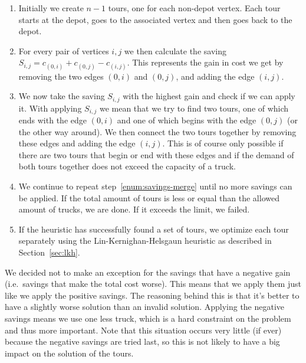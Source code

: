 \documentclass[12pt]{article}
\begin{document}
    \begin{enumerate}
        \itemsep 0em
        \item
            Initially we create $n - 1$ tours, one for each non-depot vertex. Each tour starts at
            the depot, goes to the associated vertex and then goes back to the depot.
        \item
            For every pair of vertices $i, j$ we then calculate the saving $S_{i, j} =
            c_{(0, i)} + c_{(0, j)} - c_{(i, j)}$. This represents the gain in cost we get by
            removing the two edges $(0, i)$ and $(0, j)$, and adding the edge $(i, j)$.
        \item
        \label{enum:savings-merge}
            We now take the saving $S_{i, j}$ with the highest gain and check if we can apply it.
            With applying $S_{i, j}$ we mean that we try to find two tours, one of which ends with
            the edge $(0, i)$ and one of which begins with the edge $(0, j)$ (or the other way
            around). We then connect the two tours together by removing these edges and adding the
            edge $(i, j)$.
            This is of course only possible if there are two tours that begin or end with these
            edges and if the demand of both tours together does not exceed the capacity of a truck.
        \item
            We continue to repeat step~\ref{enum:savings-merge} until no more savings can be
            applied. If the total amount of tours is less or equal than the allowed amount of
            trucks, we are done. If it exceeds the limit, we failed.
        \item
            If the heuristic has successfully found a set of tours, we optimize each tour separately
            using the Lin-Kernighan-Helsgaun heuristic as described in Section~\ref{sec:lkh}.
    \end{enumerate}

    We decided not to make an exception for the savings that have a negative gain (i.e.\ savings
    that make the total cost worse). This means that we apply them just like we apply the positive
    savings.
    The reasoning behind this is that it's better to have a slightly worse solution than an invalid
    solution. Applying the negative savings means we use one less truck, which is a hard constraint
    on the problem and thus more important.
    Note that this situation occurs very little (if ever) because the negative savings are tried
    last, so this is not likely to have a big impact on the solution of the tours.
\end{document}
